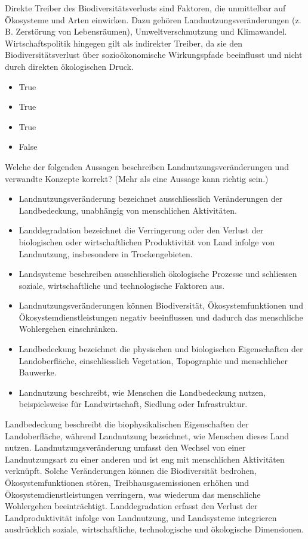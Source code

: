 \documentclass[
  nswissgerman,
  a4paper,
  DIV=11,
  numbers=noendperiod,
  oneside,
  openany]{scrreprt}
\providecommand{\tightlist}{%
  \setlength{\itemsep}{0pt}\setlength{\parskip}{0pt}}
\begin{document}
Direkte Treiber des Biodiversitätsverlusts sind Faktoren, die
unmittelbar auf Ökosysteme und Arten einwirken. Dazu gehören
Landnutzungsveränderungen (z. B. Zerstörung von Lebensräumen),
Umweltverschmutzung und Klimawandel. Wirtschaftspolitik hingegen gilt
als indirekter Treiber, da sie den Biodiversitätsverlust über
sozioökonomische Wirkungspfade beeinflusst und nicht durch direkten
ökologischen Druck.

\begin{itemize}
\tightlist
\item
  True
\item
  True
\item
  True
\item
  False
\end{itemize}

Welche der folgenden Aussagen beschreiben Landnutzungsveränderungen und
verwandte Konzepte korrekt? (Mehr als eine Aussage kann richtig sein.)

\begin{itemize}
\tightlist
\item[$\square$]
  Landnutzungsveränderung bezeichnet ausschliesslich Veränderungen der
  Landbedeckung, unabhängig von menschlichen Aktivitäten.
\item[$\square$]
  Landdegradation bezeichnet die Verringerung oder den Verlust der
  biologischen oder wirtschaftlichen Produktivität von Land infolge von
  Landnutzung, insbesondere in Trockengebieten.
\item[$\square$]
  Landsysteme beschreiben ausschliesslich ökologische Prozesse und
  schliessen soziale, wirtschaftliche und technologische Faktoren aus.
\item[$\square$]
  Landnutzungsveränderungen können Biodiversität, Ökosystemfunktionen
  und Ökosystemdienstleistungen negativ beeinflussen und dadurch das
  menschliche Wohlergehen einschränken.
\item[$\square$]
  Landbedeckung bezeichnet die physischen und biologischen Eigenschaften
  der Landoberfläche, einschliesslich Vegetation, Topographie und
  menschlicher Bauwerke.
\item[$\square$]
  Landnutzung beschreibt, wie Menschen die Landbedeckung nutzen,
  beispielsweise für Landwirtschaft, Siedlung oder Infrastruktur.
\end{itemize}

Landbedeckung beschreibt die biophysikalischen Eigenschaften der
Landoberfläche, während Landnutzung bezeichnet, wie Menschen dieses Land
nutzen. Landnutzungsveränderung umfasst den Wechsel von einer
Landnutzungsart zu einer anderen und ist eng mit menschlichen
Aktivitäten verknüpft. Solche Veränderungen können die Biodiversität
bedrohen, Ökosystemfunktionen stören, Treibhausgasemissionen erhöhen und
Ökosystemdienstleistungen verringern, was wiederum das menschliche
Wohlergehen beeinträchtigt. Landdegradation erfasst den Verlust der
Landproduktivität infolge von Landnutzung, und Landsysteme integrieren
ausdrücklich soziale, wirtschaftliche, technologische und ökologische
Dimensionen.
\end{document}
